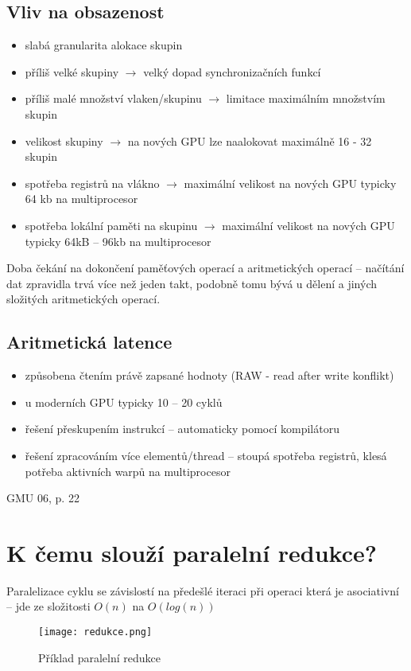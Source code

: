 	\subsection*{Vliv na obsazenost}
		\begin{itemize}
			\setlength\itemsep{0em}
			\item slabá granularita alokace skupin
			\item příliš velké skupiny $\rightarrow$ velký dopad synchronizačních funkcí
			\item příliš malé množství vlaken/skupinu $\rightarrow$ limitace maximálním množstvím skupin
			\item velikost skupiny $\rightarrow$ na nových GPU lze naalokovat maximálně 16 - 32 skupin
			\item spotřeba registrů na vlákno $\rightarrow$ maximální velikost na nových GPU typicky 64 kb na multiprocesor
			\item spotřeba lokální paměti na skupinu $\rightarrow$ maximální velikost na nových GPU typicky 64kB -- 96kb na multiprocesor
		\end{itemize}


	Doba čekání na dokončení paměťových operací a aritmetických operací – načítání dat zpravidla trvá více než jeden takt, podobně tomu bývá u dělení a jiných složitých aritmetických operací.
	
	\subsection*{Aritmetická latence}
	\begin{itemize}
		\setlength\itemsep{0em}
		\item způsobena čtením právě zapsané hodnoty (RAW - read after write konflikt)
		\item u moderních GPU typicky 10 -- 20 cyklů
		\item řešení přeskupením instrukcí -- automaticky pomocí kompilátoru
		\item řešení zpracováním více elementů/thread -- stoupá spotřeba registrů, klesá potřeba aktivních warpů na multiprocesor
	\end{itemize}


	GMU 06, p. 22
	

\section{K čemu slouží paralelní redukce?}
	Paralelizace cyklu se závislostí na předešlé iteraci při operaci která je asociativní -- jde ze složitosti $O(n)$ na $O(log(n))$
	\begin{figure}[h]
		\centering
		\texttt{[image: redukce.png]}
		\caption{Příklad paralelní redukce}
		\label{fig:redukce}
	\end{figure}


